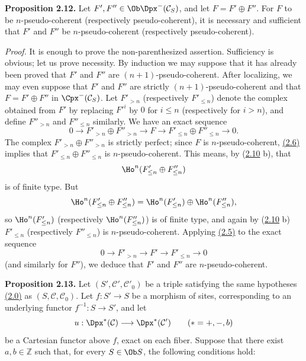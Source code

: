 \textbf{Proposition 2.12.} Let \(F',F''\in\Ob\Dpx^-(\mathcal C_S)\), and let \(F=F'\oplus F''\). For \(F\) to be \(n\)-pseudo-coherent (respectively pseudo-coherent), it is necessary and sufficient that \(F'
\) and \(F''\) be \(n\)-pseudo-coherent (respectively pseudo-coherent).

\emph{Proof.} It is enough to prove the non-parenthesized assertion. Sufficiency is obvious; let us prove necessity. By induction we may suppose that it has already been proved that \(F'\) and \(F''\) are \((n+1)\)-pseudo-coherent. After localizing, we may even suppose that \(F'\) and \(F''\) are strictly \((n+1)\)-pseudo-coherent and that \(F=F'\oplus F''\) in \(\Cpx^-(\mathcal C_S)\). Let \(F'_{>n}\) (respectively \(F'_{\leq n}\)) denote the complex obtained from \(F'\) by replacing \(F'^i\) by \(0\) for \(i\leq n\) (respectively for \(i>n\)), and define \(F''_{>n}\) and \(F''_{\leq n}\) similarly. We have an exact sequence
\[
  0\longrightarrow F'_{>n}\oplus F''_{>n}\longrightarrow F
  \longrightarrow F'_{\leq n}\oplus F''_{\leq n}\longrightarrow 0 .
\]
The complex \(F'_{>n}\oplus F''_{>n}\) is strictly perfect; since \(F\) is \(n\)-pseudo-coherent, \hyperlink{sga6.e01.schol.2-6}{(2.6)} implies that \(F'_{\leq n}\oplus F''_{\leq n}\) is \(n\)-pseudo-coherent. This means, by (\hyperlink{sga6.e01.prop.2-10}{2.10} b), that
\[
  \Ho^n(F'_{\leq n}\oplus F''_{\leq n})
\]
is of finite type. But
\[
  \Ho^n(F'_{\leq n}\oplus F''_{\leq n})
  =\Ho^n(F'_{\leq n})\oplus \Ho^n(F''_{\leq n}),
\]
so \(\Ho^n(F'_{\leq n})\) (respectively \(\Ho^n(F''_{\leq n})\)) is of finite type, and again by (\hyperlink{sga6.e01.prop.2-10}{2.10} b) \(F'_{\leq n}\) (respectively \(F''_{\leq n}\)) is \(n\)-pseudo-coherent. Applying \hyperlink{sga6.e01.prop.2-5}{(2.5)} to the exact sequence
\[
  0\longrightarrow F'_{>n}\longrightarrow F'\longrightarrow F'_{\leq n}\longrightarrow 0
\]
(and similarly for \(F''\)), we deduce that \(F'\) and \(F''\) are \(n\)-pseudo-coherent.

\textbf{Proposition 2.13.} Let \((S',\mathcal C',\mathcal C'_0)\) be a triple satisfying the same hypotheses \hyperlink{sga6.e01.para.2-0}{(2.0)} as \((S,\mathcal C,\mathcal C_0)\). Let \(f:S'\to S\) be a morphism of sites, corresponding to an underlying functor \(f^{-1}:S\to S'\), and let
\[
  u:\Dpx^*(\mathcal C)\longrightarrow \Dpx^*(\mathcal C')\qquad (*=+,-,b)
\]
be a Cartesian functor above \(f\), exact on each fiber. Suppose that there exist \(a,b\in\mathbb Z\) such that, for every \(S\in\Ob S\), the following conditions hold:


